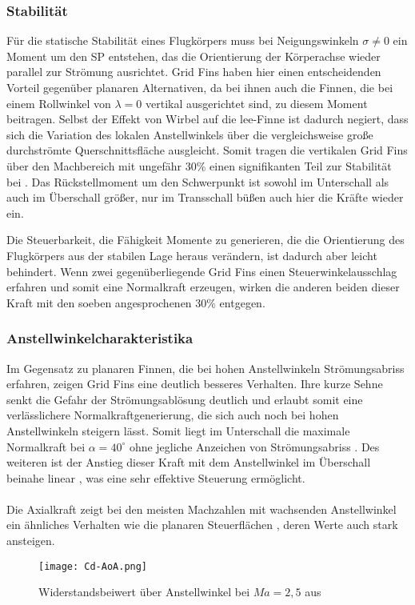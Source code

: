\subsubsection{Stabilität}
Für die statische Stabilität eines Flugkörpers muss bei Neigungswinkeln $\sigma \neq 0$ ein Moment um den \gls{SP} entstehen, das die Orientierung der Körperachse wieder parallel zur Strömung ausrichtet. Grid Fins haben hier einen entscheidenden Vorteil gegenüber planaren Alternativen, da bei ihnen auch die Finnen, die bei einem Rollwinkel von $\lambda = 0$ vertikal ausgerichtet sind, zu diesem Moment beitragen. Selbst der Effekt von Wirbel auf die lee-Finne ist dadurch negiert, dass sich die Variation des lokalen Anstellwinkels über die vergleichsweise große durchströmte Querschnittsfläche ausgleicht. Somit tragen die vertikalen Grid Fins über den Machbereich mit ungefähr 30\% einen signifikanten Teil zur Stabilität bei \cite{vergleichPlanarNATO}. Das Rückstellmoment um den Schwerpunkt ist sowohl im Unterschall als auch im Überschall größer, nur im Transschall büßen auch hier die Kräfte wieder ein.

Die Steuerbarkeit, die Fähigkeit Momente zu generieren, die die Orientierung des Flugkörpers aus der stabilen Lage heraus verändern, ist dadurch aber leicht behindert. Wenn zwei gegenüberliegende Grid Fins einen Steuerwinkelausschlag erfahren und somit eine Normalkraft erzeugen, wirken die anderen beiden dieser Kraft mit den soeben angesprochenen 30\% entgegen.
\subsubsection{Anstellwinkelcharakteristika}
Im Gegensatz zu planaren Finnen, die bei hohen Anstellwinkeln Strömungsabriss erfahren, zeigen Grid Fins eine deutlich besseres Verhalten. Ihre kurze Sehne senkt die Gefahr der Strömungsablösung deutlich und erlaubt somit eine verlässlichere Normalkraftgenerierung, die sich auch noch bei hohen Anstellwinkeln steigern lässt. Somit liegt im Unterschall die maximale Normalkraft bei $\alpha = 40^\circ$ ohne jegliche Anzeichen von Strömungsabriss \cite{synopsis}.
Des weiteren ist der Anstieg dieser Kraft mit dem Anstellwinkel im Überschall beinahe linear \cite{synopsis}, was eine sehr effektive Steuerung ermöglicht.\\
~\\
Die Axialkraft zeigt bei den meisten Machzahlen mit wachsenden Anstellwinkel ein ähnliches Verhalten wie die planaren Steuerflächen \cite{vergleichPlanarNATO}, deren Werte auch stark ansteigen.
\begin{figure}[h]
	\centering
	\texttt{[image: Cd-AoA.png]}
	\caption{Widerstandsbeiwert über Anstellwinkel bei $Ma=2,5$ aus \cite{vergleichPlanar}}
\end{figure}\\

